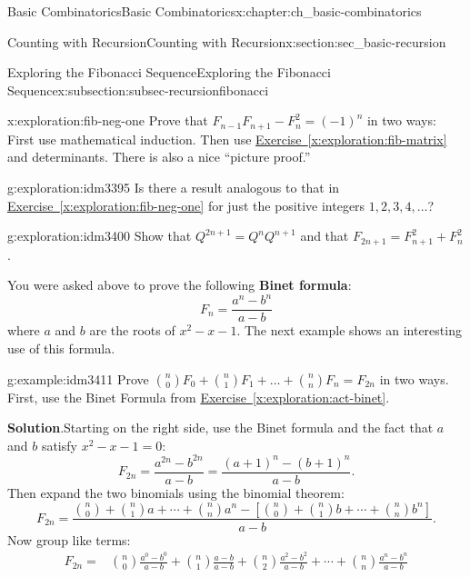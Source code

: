 \documentclass[oneside,10pt,]{book}
\newcommand{\terminology}[1]{\textbf{#1}}
\numberwithin{equation}{chapter}
\newcommand{\amp}{&}
\begin{document}
\begin{chapterptx}{Basic Combinatorics}{}{Basic Combinatorics}{}{}{x:chapter:ch_basic-combinatorics}
\begin{sectionptx}{Counting with Recursion}{}{Counting with Recursion}{}{}{x:section:sec_basic-recursion}
\begin{subsectionptx}{Exploring the Fibonacci Sequence}{}{Exploring the Fibonacci Sequence}{}{}{x:subsection:subsec-recursionfibonacci}
\begin{exploration}{}{x:exploration:fib-neg-one}%
Prove that \(F_{n - 1}F_{n + 1} - F_{n}^{2} = (-1)^{n}\) in two ways:  First use mathematical induction.  Then use \hyperref[x:exploration:fib-matrix]{Exercise~\ref{x:exploration:fib-matrix}} and determinants.  There is also a nice ``picture proof.''%
\end{exploration}
\begin{exploration}{}{g:exploration:idm3395}%
Is there a result analogous to that in \hyperref[x:exploration:fib-neg-one]{Exercise~\ref{x:exploration:fib-neg-one}} for just the positive integers \(1, 2, 3, 4, \ldots\)?%
\end{exploration}
\begin{exploration}{}{g:exploration:idm3400}%
Show that \(Q^{2n + 1} = Q^{n}Q^{n+1}\) and that \(F_{2n + 1} = F_{n + 1}^{2} + F_{n}^{2}\) .%
\end{exploration}
You were asked above to prove the following \terminology{Binet formula}:%
\begin{equation*}
F_n = \frac{a^n-b^n}{a-b}
\end{equation*}
where \(a\) and \(b\) are the roots of \(x^2 - x - 1\).  The next example shows an interesting use of this formula.%
\begin{example}{}{g:example:idm3411}%
Prove \(\binom{n}{0}F_{0} + \binom{n}{1}F_{1} + \ldots + \binom{n}{n}F_{n} = F_{2n}\) in two ways.  First, use the Binet Formula from \hyperref[x:exploration:act-binet]{Exercise~\ref{x:exploration:act-binet}}.%
\par\smallskip%
\noindent\textbf{Solution}.\hypertarget{g:solution:idm3416}{}\quad{}Starting on the right side, use the Binet formula and the fact that \(a\) and \(b\) satisfy \(x^2 - x - 1 = 0\):%
\begin{equation*}
F_{2n} = \frac{a^{2n} - b^{2n}}{a-b} = \frac{(a+1)^n - (b+1)^n}{a-b}\text{.}
\end{equation*}
Then expand the two binomials using the binomial theorem:%
\begin{equation*}
F_{2n} = \frac{\binom{n}{0} + \binom{n}{1}a + \cdots + \binom{n}{n}a^n - \left[\binom{n}{0} + \binom{n}{1}b + \cdots + \binom{n}{n}b^n\right]}{a-b}\text{.}
\end{equation*}
Now group like terms:%
\begin{align*}
F_{2n} = \amp \binom{n}{0}\frac{a^0-b^0}{a-b} + \binom{n}{1}\frac{a-b}{a-b} + \binom{n}{2}\frac{a^2-b^2}{a-b}+\cdots + \binom{n}{n}\frac{a^n-b^n}{a-b} \\

\end{align*}
\end{example}
\end{subsectionptx}
\end{sectionptx}
\end{chapterptx}
\end{document}
